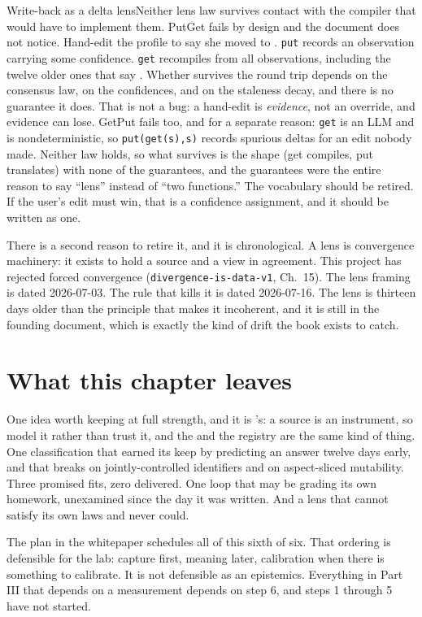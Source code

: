 \begin{Analogy}{Write-back as a delta lens}{Neither lens law survives contact with the compiler that would have to implement them.}
PutGet fails by design and the document does not notice. Hand-edit the profile to say she moved to \labVenueAlt{}. \texttt{put} records an observation carrying some confidence. \texttt{get} recompiles from all observations, including the twelve older ones that say \labVenueCity{}. Whether \labVenueAlt{} survives the round trip depends on the consensus law, on the confidences, and on the staleness decay, and there is no guarantee it does. That is not a bug: a hand-edit is \emph{evidence}, not an override, and evidence can lose. GetPut fails too, and for a separate reason: \texttt{get} is an LLM and is nondeterministic, so \texttt{put(get(s),s)} records spurious deltas for an edit nobody made. Neither law holds, so what survives is the shape (get compiles, put translates) with none of the guarantees, and the guarantees were the entire reason to say ``lens'' instead of ``two functions.'' The vocabulary should be retired. If the user's edit must win, that is a confidence assignment, and it should be written as one.
\end{Analogy}

There is a second reason to retire it, and it is chronological. A lens is convergence machinery: it exists to hold a source and a view in agreement. This project has rejected forced convergence (\texttt{divergence-is-data-v1}, Ch.~15). The lens framing is dated 2026-07-03. The rule that kills it is dated 2026-07-16. The lens is thirteen days older than the principle that makes it incoherent, and it is still in the founding document, which is exactly the kind of drift the book exists to catch.

\section{What this chapter leaves}

One idea worth keeping at full strength, and it is \labPI's: a source is an instrument, so model it rather than trust it, and the \labMagnetShort{} and the registry are the same kind of thing. One classification that earned its keep by predicting an answer twelve days early, and that breaks on jointly-controlled identifiers and on aspect-sliced mutability. Three promised fits, zero delivered. One loop that may be grading its own homework, unexamined since the day it was written. And a lens that cannot satisfy its own laws and never could.

The plan in the whitepaper schedules all of this sixth of six. That ordering is defensible for the lab: capture first, meaning later, calibration when there is something to calibrate. It is not defensible as an epistemics. Everything in Part III that depends on a measurement depends on step 6, and steps 1 through 5 have not started.
